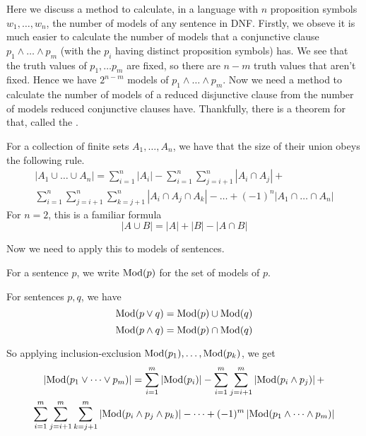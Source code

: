 \documentclass[11pt]{article}
\begin{document}
\begin{method}
    Here we discuss a method to calculate, in a language with $n$ proposition symbols $w_1, \dots, w_n$, the number of models of any sentence in DNF.
    \mypar
    Firstly, we obseve it is much easier to calculate the number of models that a conjunctive clause $p_1 \land \dots \land p_m$ (with the $p_i$ having distinct proposition symbols) has. We see that the truth values of $p_1, \dots p_m$ are fixed, so there are $n - m$ truth values that aren't fixed. Hence we have $2^{n-m}$ models of $p_1 \land \dots \land p_m$.
    \mypar
    Now we need a method to calculate the number of models of a reduced disjunctive clause from the number of models reduced conjunctive clauses have. Thankfully, there is a theorem for that, called the .
    \begin{theorem}
        For a collection of finite sets $A_1, \dots, A_n$, we have that the size of their union obeys the following rule.
        \begin{multline*}
            \left|A_1 \cup \dots \cup A_n\right| = \sum_{i=1}^{n} \left|A_i\right| - \sum_{i=1}^{n} \sum_{j=i+1}^{n} \left|A_i \cap A_j\right| + \\ \sum_{i=1}^{n} \sum_{j=i+1}^{n} \sum_{k=j+1}^{n} \left|A_i \cap A_j \cap A_k \right| - \dots + (-1)^n\left|A_1 \cap \dots \cap A_n\right|
        \end{multline*}  
        For $n = 2$, this is a familiar formula
        \[|A \cup B| = |A| + |B| - |A \cap B| \] 
    \end{theorem}
    Now we need to apply this to models of sentences.
    \begin{notation}
        For a sentence $p$, we write $\mathrm{Mod}(p)$ for the set of models of $p$.
    \end{notation}
    \begin{lem} For sentences $p,q$, we have 
        \[\mathrm{Mod}(p \lor q) = \mathrm{Mod}(p) \cup \mathrm{Mod}(q)\] \[\mathrm{Mod}(p \land q) = \mathrm{Mod}(p) \cap \mathrm{Mod}(q)\]
    \end{lem}
    So applying inclusion-exclusion $\mathrm{Mod}(p_1), \dots, \mathrm{Mod}(p_k)$, we get
    \begin{multline*}
        \left|\mathrm{Mod}(p_1 \lor \dots \lor p_m)\right| = \sum_{i=1}^{m} \left|\mathrm{Mod}(p_i)\right| - \sum_{i=1}^{m} \sum_{j=i+1}^{m} \left|\mathrm{Mod}(p_i \land p_j)\right| + \\ \sum_{i=1}^{m} \sum_{j=i+1}^{m} \sum_{k=j+1}^{m} \left|\mathrm{Mod}(p_i \land p_j \land p_k) \right| - \dots + (-1)^m\left|\mathrm{Mod}(p_1 \land \dots \land p_m)\right|
    \end{multline*} 
\end{method}
\end{document}
